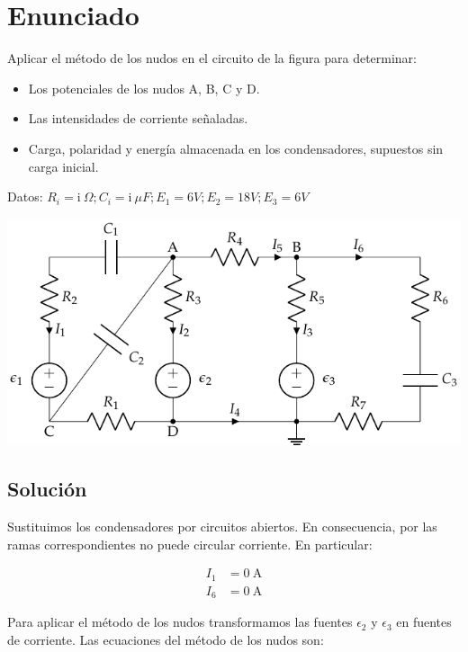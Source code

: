 
\section{Enunciado}
Aplicar el método de los nudos en el circuito de la figura para
determinar:
\begin{itemize}
\item Los potenciales de los nudos A, B, C y D.
\item Las intensidades de corriente señaladas.
\item Carga, polaridad y energía almacenada en los condensadores,
  supuestos sin carga inicial.
\end{itemize}
Datos:
$R_i = \mathrm{i\ } \Omega; C_i = \mathrm{i\ } \mu F; E_1 = 6V; E_2 =
18 V; E_3 = {6} V$

\begin{center}
  \includegraphics[]{figuras/nudos_condensadores.pdf}
\end{center}

\subsection*{Solución}

Sustituimos los condensadores por circuitos abiertos. En consecuencia, por las ramas correspondientes no puede circular corriente. En particular:

\begin{align*}
  I_1 &= \qty{0}{\ampere}\\
  I_6 &= \qty{0}{\ampere}
\end{align*}

Para aplicar el método de los nudos transformamos las fuentes $\epsilon_2$ y $\epsilon_3$ en fuentes de corriente. Las ecuaciones del método de los nudos son:

